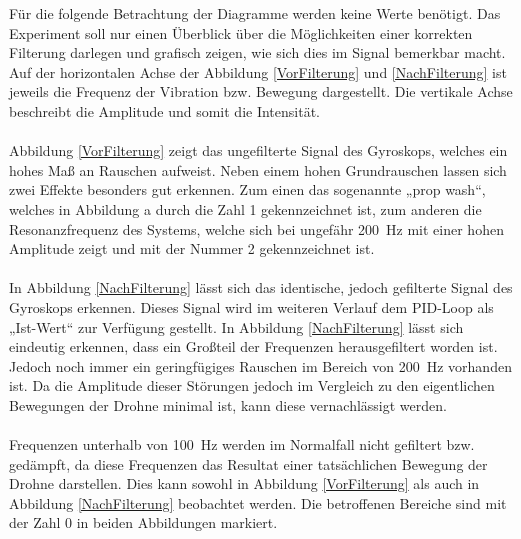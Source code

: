        Für die folgende Betrachtung der Diagramme werden keine Werte benötigt. Das Experiment soll nur
       einen Überblick über die Möglichkeiten einer korrekten Filterung darlegen und grafisch zeigen,
       wie sich dies im Signal bemerkbar macht. Auf der horizontalen Achse der Abbildung \ref*{VorFilterung}
       und \ref*{NachFilterung} ist jeweils die Frequenz der Vibration bzw. Bewegung dargestellt.
       Die vertikale Achse beschreibt die Amplitude und somit die Intensität. \\
       \\
       Abbildung \ref*{VorFilterung} zeigt das ungefilterte Signal des Gyroskops, welches ein hohes Maß an Rauschen aufweist.
       Neben einem hohen Grundrauschen lassen sich zwei Effekte besonders gut erkennen. Zum einen das
       sogenannte „prop wash“, welches in Abbildung a durch die Zahl 1 gekennzeichnet ist, zum anderen
       die Resonanzfrequenz des Systems, welche sich bei ungefähr \qty{200}{\Hz} mit einer hohen Amplitude zeigt
       und mit der Nummer 2 gekennzeichnet ist. \\
       \\
       In Abbildung \ref*{NachFilterung} lässt sich das identische, jedoch gefilterte Signal des Gyroskops erkennen. Dieses
       Signal wird im weiteren Verlauf dem PID-Loop als „Ist-Wert“ zur Verfügung gestellt. In Abbildung \ref*{NachFilterung} lässt
       sich eindeutig erkennen, dass ein Großteil der Frequenzen herausgefiltert worden ist. Jedoch noch
       immer ein geringfügiges Rauschen im Bereich von \qty{200}{\Hz} vorhanden ist. Da die Amplitude dieser Störungen
       jedoch im Vergleich zu den eigentlichen Bewegungen der Drohne minimal ist, kann diese vernachlässigt werden. \\
       \\
       Frequenzen unterhalb von \qty{100}{\Hz} werden im Normalfall nicht gefiltert bzw. gedämpft, da diese Frequenzen
       das Resultat einer tatsächlichen Bewegung der Drohne darstellen. Dies kann sowohl in Abbildung \ref*{VorFilterung} als auch
       in Abbildung \ref*{NachFilterung} beobachtet werden. Die betroffenen Bereiche sind mit der Zahl 0 in beiden Abbildungen markiert.
        
